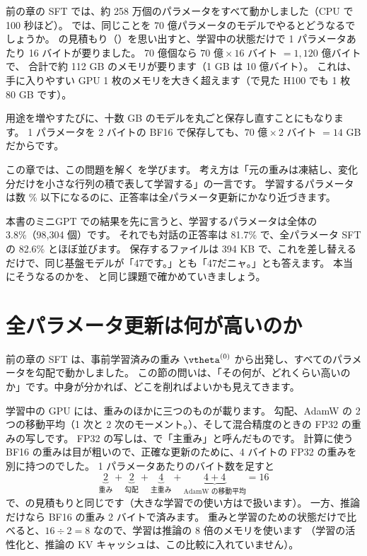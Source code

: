 前の章の SFT では、約 258 万個のパラメータをすべて動かしました（CPU で 100 秒ほど）。
では、同じことを 70 億パラメータのモデルでやるとどうなるでしょうか。
の見積もり（）を思い出すと、学習中の状態だけで 1 パラメータあたり 16 バイトが要りました。
70 億個なら $70\text{ 億}\times16$ バイト $=1{,}120$ 億バイトで、
合計で約 112 GB のメモリが要ります（1 GB は 10 億バイト）。
これは、手に入りやすい GPU 1 枚のメモリを大きく超えます（で見た H100 でも 1 枚 80 GB です）。

用途を増やすたびに、十数 GB のモデルを丸ごと保存し直すことにもなります。
1 パラメータを 2 バイトの BF16 で保存しても、$70\text{ 億}\times2$ バイト $=14$ GB だからです。

この章では、この問題を解く を学びます\cite{hu2022lora}。
考え方は「元の重みは凍結し、変化分だけを小さな行列の積で表して学習する」の一言です。
学習するパラメータは数 \% 以下になるのに、正答率は全パラメータ更新にかなり近づきます。

本書のミニGPT での結果を先に言うと、学習するパラメータは全体の 3.8\%（98,304 個）です。
それでも対話の正答率は 81.7\% で、全パラメータ SFT の 82.6\% とほぼ並びます。
保存するファイルは 394 KB で、これを差し替えるだけで、同じ基盤モデルが「47です。」とも「47だニャ。」とも答えます。
本当にそうなるのかを、 と同じ課題で確かめていきましょう。

\section{全パラメータ更新は何が高いのか}\label{sec:lora-cost}

前の章の SFT は、事前学習済みの重み $\vtheta^{(0)}$ から出発し、すべてのパラメータを勾配で動かしました。
この節の問いは、「その何が、どれくらい高いのか」です。中身が分かれば、どこを削ればよいかも見えてきます。

学習中の GPU には、重みのほかに三つのものが載ります。
勾配、AdamW の 2 つの移動平均（1 次と 2 次のモーメント。）、そして混合精度のときの FP32 の重みの写しです。
FP32 の写しは、で「主重み」と呼んだものです。
計算に使う BF16 の重みは目が粗いので、正確な更新のために、4 バイトの FP32 の重みを別に持つのでした。
1 パラメータあたりのバイト数を足すと
\[
\underbrace{2}_{\text{重み}}+\underbrace{2}_{\text{勾配}}+\underbrace{4}_{\text{主重み}}+\underbrace{4+4}_{\text{AdamW の移動平均}}=16
\]
で、の見積もりと同じです（大きな学習での使い方はで扱います）。
一方、推論だけなら BF16 の重み 2 バイトで済みます。
重みと学習のための状態だけで比べると、$16\div2=8$ なので、学習は推論の 8 倍のメモリを使います
（学習の活性化と、推論の KV キャッシュは、この比較に入れていません）。

